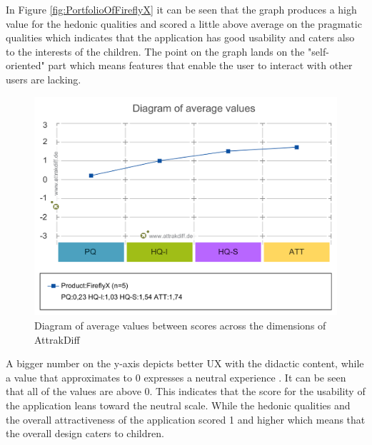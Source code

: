 In Figure \ref{fig:PortfolioOfFireflyX} it can be seen that the graph produces a high value for the hedonic qualities and scored a little above average on the pragmatic qualities which indicates that the application has good usability and caters also to the interests of the children. The point on the graph lands on the "self-oriented" part which means features that enable the user to interact with other users are lacking.

\begin{figure}[H]
    \centering
    \includegraphics[width=14cm]{figures/NewFigures/Diagram_of_average_values.png}
    \caption{Diagram of average values between scores across the dimensions of AttrakDiff}
    \label{fig:DiagramOfAverageValues}
\end{figure}

A bigger number on the y-axis depicts better UX with the didactic content, while a value that approximates to 0 expresses a neutral experience \cite{giardi2019evaluate}. It can be seen that all of the values are above 0. This indicates that the score for the usability of the application leans toward the neutral scale. While the hedonic qualities and the overall attractiveness of the application scored 1 and higher which means that the overall design caters to children.

